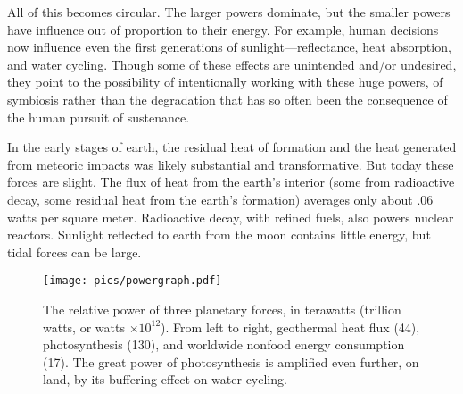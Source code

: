 \documentclass[11pt,letterpaper,twoside,onecolumn]{memoir}
\begin{document}
\noindent All of this becomes circular. The larger powers dominate, but the smaller powers have influence out of proportion to their energy. For example, human decisions now influence even the first generations of sunlight---reflectance, heat absorption, and water cycling. Though some of these effects are unintended and/or undesired, they point to the possibility of intentionally working with these huge powers, of symbiosis rather than the degradation that has so often been the consequence of the human pursuit of sustenance.

In the early stages of earth, the residual heat of formation and the heat generated from meteoric impacts was likely substantial and transformative. But today these forces are slight. The flux of heat from the earth's interior (some from radioactive decay, some residual heat from the earth's formation) averages only about .06 watts per square meter. Radioactive decay, with refined fuels, also powers nuclear reactors. Sunlight reflected to earth from the moon contains little energy, but tidal forces can be large.

\begin{wrapfigure}[28]{R}{6cm}
\centering
\vspace{-2em}
\begin{framed}
\texttt{[image: pics/powergraph.pdf]}
\caption*{The relative power of three planetary forces, in terawatts (trillion watts, or watts $\times 10^{12}$). From left to right, geothermal heat flux (44), photosynthesis (130), and worldwide nonfood energy consumption (17). The great power of photosynthesis is amplified even further, on land, by its buffering effect on water cycling.}
\end{framed}
\end{wrapfigure}
\end{document}
